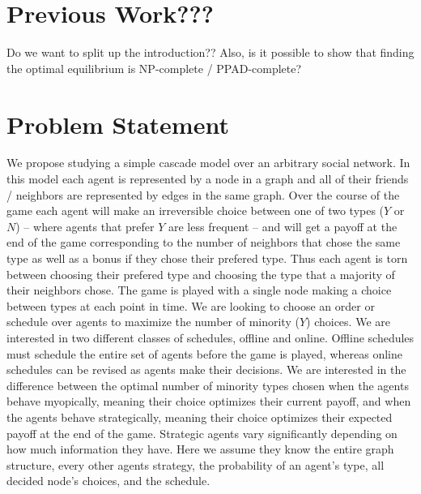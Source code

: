 \documentclass{article}
\begin{document}
\section{Previous Work???}

Do we want to split up the introduction??
Also, is it possible to show that finding the optimal equilibrium is
NP-complete / PPAD-complete?

\section{Problem Statement}
\label{prob_statement}
We propose studying a simple cascade model over an arbitrary social
network. In this model each agent is represented by a node in a graph
and all of their friends / neighbors are represented by edges in the
same graph. Over the course of the game each agent will make an
irreversible choice between one of two types ($Y$ or $N$) -- where
agents that prefer $Y$ are less frequent -- and will get a payoff at
the end of the game corresponding to the number of neighbors that
chose the same type as well as a bonus if they chose their prefered
type. Thus each agent is torn between choosing their prefered type and
choosing the type that a majority of their neighbors chose. The game
is played with a single node making a choice between types at each
point in time. We are looking to choose an order or schedule over
agents to maximize the number of minority ($Y$) choices. We are
interested in two different classes of schedules, offline and
online. Offline schedules must schedule the entire set of agents
before the game is played, whereas online schedules can be revised as
agents make their decisions. We are interested in the difference
between the optimal number of minority types chosen when the agents
behave myopically, meaning their choice optimizes their current
payoff, and when the agents behave strategically, meaning their choice
optimizes their expected payoff at the end of the game. Strategic
agents vary significantly depending on how much information they
have. Here we assume they know the entire graph structure, every other
agents strategy, the probability of an agent’s type, all decided
node's choices, and the schedule.
\end{document}
